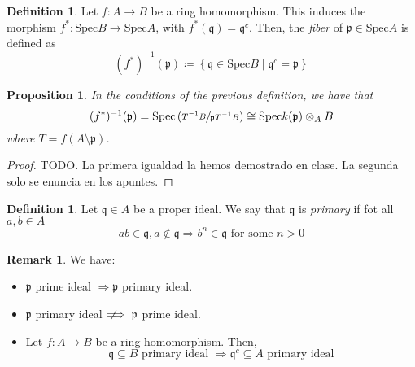 \documentclass[11pt]{article}
\newtheorem{prop}[theorem]{Proposition}
\theoremstyle{definition}
\newtheorem{defn}[theorem]{Definition}
\newtheorem{rk}[theorem]{Remark}
\newcommand{\notimplies}{\;\not\!\!\!\implies}
\begin{document}
        \begin{defn}
            Let $f: A \longrightarrow B$ be a ring homomorphism.
            This induces the morphism $f^*:\text{Spec} B \longrightarrow\text{Spec} A$, with $f^*(\mathfrak{q}) = \mathfrak{q}^c$.
            Then, the \emph{fiber} of $\mathfrak{p} \in\text{Spec}A$ is defined as
            \[
                (f^*)^{-1}(\mathfrak{p}) \coloneqq \left\{ \mathfrak{q} \in\text{Spec} B \mid \mathfrak{q}^c = \mathfrak{p} \right\}
            \]
        \end{defn}

        \begin{prop}
            In the conditions of the previous definition, we have that
            \[
                (f^*)^{-1}(\mathfrak{p}) =\text{Spec} \left( \sfrac{T^{-1}B}{\mathfrak{p}T^{-1}B} \right) \cong\text{Spec} k(\mathfrak{p}) \otimes_A B
            \]
            where $T = f(A \setminus \mathfrak{p})$.
        \end{prop}
            \begin{proof}

                TODO. La primera igualdad la hemos demostrado en clase.
                La segunda solo se enuncia en los apuntes.

            \end{proof}

        \begin{defn}
            Let $\mathfrak{q} \in A$ be a proper ideal.
            We say that $\mathfrak{q}$ is \emph{primary} if fot all $a, b \in A$
            \[
                ab \in \mathfrak{q}, a \notin \mathfrak{q} \Longrightarrow b^n \in \mathfrak{q} \text{ for some } n > 0
            \]
        \end{defn}

        \begin{rk}
            We have:
            \begin{itemize}
                \item $\mathfrak{p}$ prime ideal $\Longrightarrow \mathfrak{p}$ primary ideal.
                \item $\mathfrak{p}$ primary ideal $\notimplies \mathfrak{p}$ prime ideal.
                \item Let $f: A \longrightarrow B$ be a ring homomorphism.
                Then,
                \[
                    \mathfrak{q} \subseteq B \text{ primary ideal } \Longrightarrow \mathfrak{q}^c \subseteq A \text{ primary ideal}
                \]
            \end{itemize}
        \end{rk}
\end{document}

